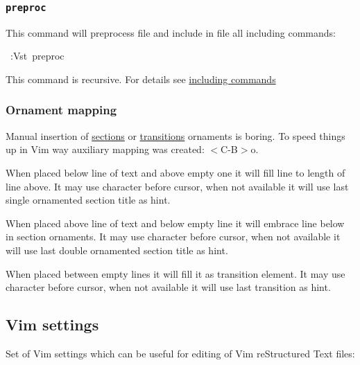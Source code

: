\documentclass[12pt]{article}
\begin{document}
\hypertarget{l9696preproc9696}{}
\subsubsection{\texttt{preproc}}

This command will preprocess file and include in file all including commands:

\begin{ttfamily}\begin{flushleft}
\mbox{~:Vst~preproc}\\
\end{flushleft}\end{ttfamily}

This command is recursive. For details see \href{\#lincluding-commands}{including commands}

\hypertarget{lornament-mapping}{}
\subsubsection{Ornament mapping}

Manual insertion of \href{\#lsections}{sections} or \href{\#ltransitions}{transitions} ornaments is boring. To speed
things up in Vim way auxiliary mapping was created: $<$C-B$>$o.

When placed below line of text and above empty one it will fill line to length
of line above. It may use character before cursor, when not available it will
use last single ornamented section title as hint.

When placed above line of text and below empty line it will embrace line below
in section ornaments. It may use character before cursor, when not available it
will use last double ornamented section title as hint.

When placed between empty lines it will fill it as transition element. It may
use character before cursor, when not available it will use last transition as
hint.

\hypertarget{lvim-settings}{}
\subsection{Vim settings}

Set of Vim settings which can be useful for editing of Vim reStructured Text files:
\end{document}
